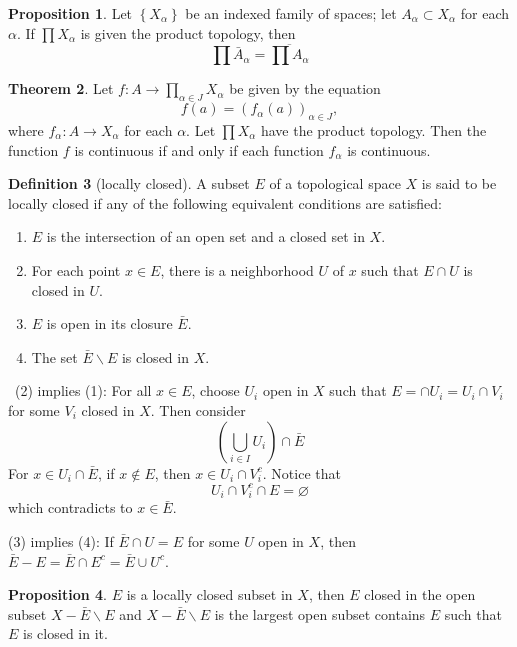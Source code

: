 \documentclass[12pt,a4paper]{book}
\newenvironment{prooff}{{\noindent\it\textcolor{cyan!40!black}{Proof}:}\,}{\par}
\newenvironment{enu}{\begin{enumerate}[(1)]}{\end{enumerate}}
\theoremstyle{definition}
\newtheorem{defn}{Definition}[section]
\newtheorem{theo}[defn]{Theorem}
\newtheorem{prop}[defn]{Proposition}
\begin{document}
\begin{prop}
    Let $\left\{X_\alpha\right\}$ be an indexed family of spaces; let $A_\alpha \subset X_\alpha$ for each $\alpha$. If $\prod X_\alpha$ is given the product topology, then
    $$
        \prod \bar{A}_\alpha=\overline{\prod A_\alpha}
    $$
\end{prop}
\begin{theo}
    Let $f: A \rightarrow \prod_{\alpha \in J} X_\alpha$ be given by the equation
    $$
        f(a)=\left(f_\alpha(a)\right)_{\alpha \in J},
    $$
    where $f_\alpha: A \rightarrow X_\alpha$ for each $\alpha$. Let $\prod X_\alpha$ have the product topology. Then the function $f$ is continuous if and only if each function $f_\alpha$ is continuous.
\end{theo}
\begin{defn}[locally closed]
    A subset $E$ of a topological space $X$ is said to be locally closed if any of the following equivalent conditions are satisfied:
\begin{enu} 
    \item $E$ is the intersection of an open set and a closed set in $X$.
    \item For each point $x \in E$, there is a neighborhood $U$ of $x$ such that $E \cap U$ is closed in $U$.
    \item $E$ is open in its closure $\bar{E}$.
    \item The set $\bar{E} \backslash E$ is closed in $X$.
\end{enu}
\end{defn}
\begin{prooff}
    (2) implies (1): For all $x\in E$, choose $U_i$ open in $X$ such that 
    $E=\cap U_i=U_i\cap V_i$ for some $V_i$ closed in $X$. Then consider 
    \begin{equation*}
        (\bigcup_{i\in I} U_i) \cap \bar{E}
    \end{equation*}
    For $x\in U_i\cap \bar{E}$, if $x\notin E$, then $x\in U_i\cap V_i^c$. Notice that 
    \begin{equation*}
        U_i\cap V_i^c\cap E=\varnothing
    \end{equation*}
    which contradicts to $x\in \bar{E}$. 

    (3) implies (4): If $\bar{E}\cap U=E$ for some $U$ open in $X$, then $\bar{E}-E=\bar{E}\cap E^c=\bar{E}\cup U^c$. 

\end{prooff}
\begin{prop}
    $E$ is a locally closed subset in $X$, then $E$ closed in the open subset $X-\bar{E}\backslash E$ and 
    $X-\bar{E}\backslash  E$ is the largest open subset contains $E$ such that $E$ is closed in it. 
\end{prop}
\end{document}
